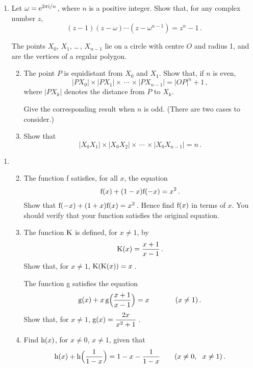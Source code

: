 \documentclass[a4, 11pt]{report}
\newlength{\qspace}
\newcounter{qnumber}
\newenvironment{question}%
 {\vspace{\qspace}
  \begin{enumerate}[\bfseries 1\quad][10]%
    \setcounter{enumi}{\value{qnumber}}%
    \item%
 }
{
  \end{enumerate}
  \filbreak
  \stepcounter{qnumber}
 }
\newenvironment{questionparts}[1][1]%
 {
  \begin{enumerate}[\bfseries (i)]%
    \setcounter{enumii}{#1}
    \addtocounter{enumii}{-1}
    \setlength{\itemsep}{5mm}
    \setlength{\parskip}{8pt}
 }
 {
  \end{enumerate}
 }
\def\e{{\rm e}}
\def\g{{\rm g}}
\def\h{{\rm h}}
\def\f{{\rm f}}
\begin{document}
\begin{question}
Let $\omega = \e^{2\pi {\rm i}/n}$, where $n$ is a  positive integer.
Show that, for any complex number $z$,
\[
(z-1)(z-\omega) \cdots (z - \omega^{n-1}) = z^n -1\,.
\]

The points $X_0$, $X_1$, \ldots\,, $X_{n-1}$ lie on a circle 
with centre $O$ and radius 1,  and are the vertices of 
a regular polygon. 
\begin{questionparts}
\item  The point  $P$ is equidistant from  $X_0$ and $X_1$.
Show that, if $n$ is even, 
\[
|PX_0| \times  |PX_1 |\times \,\cdots\, \times |PX_{n-1}| = |OP|^n +1\,
,\]
where  $|PX_ k|$ denotes
the distance from $P$ to $X_k$.

Give the corresponding result  when $n$ is odd. (There are
two cases to consider.)


\item Show that
\[
|X_0 X_1|\times  |X_0 X_2|\times  \,\cdots\, \times |X_0 X_{n-1}| =n\,.
\] 
\end{questionparts}


\end{question} 

\begin{question}

\begin{questionparts}

\item
The function f satisfies, for all $x$,  the equation 
\[
\f(x) + (1- x)\f(-x) =  x^2\, .
\]
Show that $\f(-x) + (1 + x)\f(x) =  x^2\,$.
 Hence find $\f(x)$ in terms of $x$. You should
verify that your function satisfies the original equation.

\item 
The function ${\rm K}$ is defined, for $x\ne 1$, by 
\[{\rm K}(x) = \dfrac{x+1}{x-1}\,.\] 
Show that, for $x\ne1$,
${\rm K(K(}x)) =x\,$.

The function g satisfies the equation 
\[
\g(x)+ x\, \g\Big(\frac{ x+1   }{x-1}\Big)
 = x \ \ \ \ \ \ \ \ \ \ \  
( x\ne 1)
\,.
\]
 Show
that, for $x\ne1$, $\g(x)= \dfrac{2x}{x^2+1}\,$.

\item
Find $\h(x)$, for $x\ne0$, $x\ne1$, given that 
\[
\h(x)+ \h\Big(\frac 1 {1-x}\Big)=  1-x -\frac1{1-x}
\ \ \ \ \ \ (
x\ne0, \ \ x\ne1 )
\,.
\]
\end{questionparts}

\end{question} 
\end{document}
